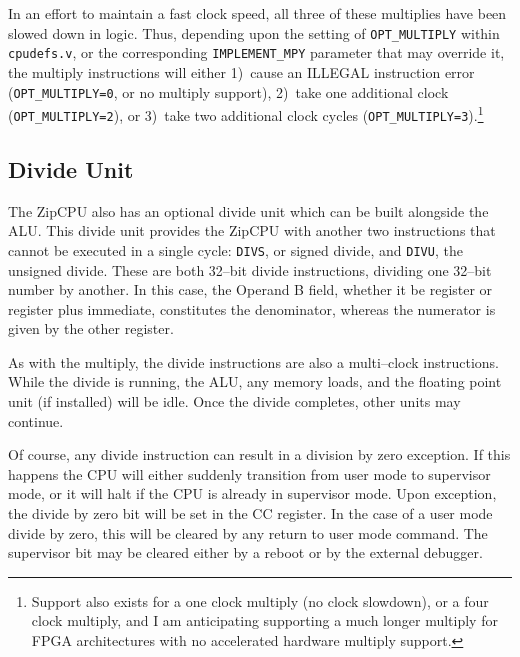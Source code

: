 \documentclass{gqtekspec}
\begin{document}
In an effort to maintain a fast clock speed, all three of these multiplies
have been slowed down in logic.  Thus, depending upon the setting of
{\tt OPT\_MULTIPLY} within {\tt cpudefs.v}, or the corresponding
{\tt IMPLEMENT\_MPY} parameter that may override it, the multiply instructions
will either 1)~cause an ILLEGAL instruction error ({\tt OPT\_MULTIPLY=0}, or
no multiply support), 2)~take one additional clock ({\tt OPT\_MULTIPLY=2}),
or 3)~take two additional clock cycles ({\tt OPT\_MULTIPLY=3}).\footnote{Support
also exists for a one clock multiply (no clock slowdown), or a four clock
multiply, and I am anticipating supporting a much longer multiply for FPGA
architectures with no accelerated hardware multiply support.}

\subsection{Divide Unit}
The ZipCPU also has an optional divide unit which can be built alongside the
ALU.  This divide unit provides the ZipCPU with another two instructions that
cannot be executed in a single cycle: {\tt DIVS}, or signed divide, and
{\tt DIVU}, the unsigned divide.  These are both 32--bit divide instructions,
dividing one 32--bit number by another.  In this case, the Operand B field,
whether it be register or register plus immediate, constitutes the denominator,
whereas the numerator is given by the other register.

As with the multiply, the divide instructions are also a multi--clock
instructions.  While the divide is running, the ALU, any memory loads, and the
floating point unit (if installed) will be idle.  Once the divide completes,
other units may continue.

Of course, any divide instruction can result in a division by zero exception. 
If this happens the CPU will either suddenly transition from user mode to
supervisor mode, or it will halt if the CPU is already in supervisor mode.  Upon
exception, the divide by zero bit will be set in the CC register.  In the
case of a user mode divide by zero, this will be cleared by any return to user
mode command.  The supervisor bit may be cleared either by a reboot or by the
external debugger.
\end{document}
